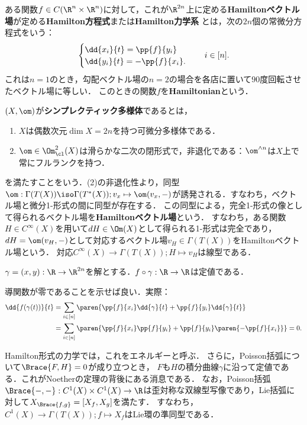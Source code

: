 \documentclass[uplatex,dvipdfmx]{jsreport}
\begin{document}
\begin{definition}[Hamiltonベクトル場の積分曲線]
    ある関数$f\in C(\R^n\times\R^n)$に対して，これが$\R^{2n}$上に定める\textbf{Hamiltonベクトル場}が定める\textbf{Hamilton方程式}または\textbf{Hamilton力学系 }とは，次の$2n$個の常微分方程式をいう：
    \[\begin{cases}
        \dd{x_i}{t}=\pp{f}{y_i}\\
        \dd{y_i}{t}=-\pp{f}{x_i}.
    \end{cases}\quad i\in[n].\]
    これは$n=1$のとき，勾配ベクトル場の$n=2$の場合を各店に置いて$90$度回転させたベクトル場に等しい．
    このときの関数$f$を\textbf{Hamiltonian}という．
\end{definition}
\begin{remarks}[一般のHamiltonベクトル場]
    $(X,\om)$が\textbf{シンプレクティック多様体}であるとは，
    \begin{enumerate}
        \item $X$は偶数次元$\dim X=2n$を持つ可微分多様体である．
        \item $\om\in\Om_\cl^2(X)$は滑らかな二次の閉形式で，非退化である：$\om^{\wedge n}$は$X$上で常にフルランクを持つ．
    \end{enumerate}
    を満たすことをいう．(2)の非退化性より，同型$\om:\Gamma(T(X))\iso\Gamma(T^*(X));v_x\mapsto\om(v_x,-)$が誘発される．すなわち，ベクトル場と微分1-形式の間に同型が存在する．
    この同型による，完全1-形式の像として得られるベクトル場を\textbf{Hamiltonベクトル場}という．
    すなわち，ある関数$H\in C^\infty(X)$を用いて$dH\in\Om(X)$として得られる1-形式は完全であり，$dH=\om(v_H,-)$として対応するベクトル場$v_H\in\Gamma(T(X))$をHamiltonベクトル場という．
    対応$C^\infty(X)\to \Gamma(T(X));H\mapsto v_H$は線型である．
\end{remarks}

\begin{theorem}[Hamiltonianは保存量である]
    $\gamma=(x,y):\R\to\R^{2n}$を解とする．$f\circ\gamma:\R\to\R$は定値である．
\end{theorem}
\begin{Proof}
    導関数が零であることを示せば良い．実際：
    \begin{align*}
        \dd{f(\gamma(t))}{t}&=\sum_{i\in[n]}\paren{\pp{f}{x_i}\dd{\gamma}{t}+\pp{f}{y_i}\dd{\gamma}{t}}\\
        &=\sum_{i\in[n]}\paren{\pp{f}{x_i}\pp{f}{y_i}+\pp{f}{y_i}\paren{-\pp{f}{x_i}}}=0.
    \end{align*}
\end{Proof}
\begin{remarks}
    Hamilton形式の力学では，これをエネルギーと呼ぶ．
    さらに，Poisson括弧について$\Brace{F,H}=0$が成り立つとき，
    $F$も$H$の積分曲線$\gamma$に沿って定値である．これがNoetherの定理の背後にある消息である．
    なお，Poisson括弧$\Brace{-,-}:C^1(X)\times C^1(X)\to\R$は歪対称な双線型写像であり，Lie括弧に対して$X_{\Brace{f,g}}=[X_f,X_g]$を満たす．
    すなわち，$C^1(X)\to\Gamma(T(X));f\mapsto X_f$はLie環の準同型である．
\end{remarks}
\end{document}
